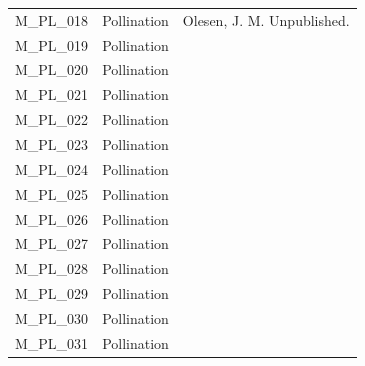 \documentclass[12pt]{article}
\begin{document}
\begin{spacing}{1.0}
\begin{table}[!h]
\begin{center}
\begin{tabular}{|l l m{10cm} |}
    M\_PL\_018  & Pollination & Olesen, J. M. Unpublished.  \\
    M\_PL\_019  & Pollination & \citep{Inouye1988}  \\
    M\_PL\_020  & Pollination & \citep{Kevan1970} \\
    M\_PL\_021  & Pollination & \citep{Kato1990}  \\
    M\_PL\_022  & Pollination & \citep{Medan2002} \\
    M\_PL\_023  & Pollination & \citep{Medan2002} \\
    M\_PL\_024  & Pollination & \citep{Mosquin1967} \\
    M\_PL\_025  & Pollination & \citep{Motten1982}  \\
    M\_PL\_026  & Pollination & \citep{McMullen1993}  \\
    M\_PL\_027  & Pollination & \citep{Primack1983} \\
    M\_PL\_028  & Pollination & \citep{Primack1983} \\
    M\_PL\_029  & Pollination & \citep{Primack1983} \\
    M\_PL\_030  & Pollination & \citep{Ramirez1992} \\
    M\_PL\_031  & Pollination & \citep{Ramirez1989} \\
    \hline
    \end{tabular}
    \end{center}
    \end{table}

    \clearpage
    \newpage


\end{spacing}
\end{document}
